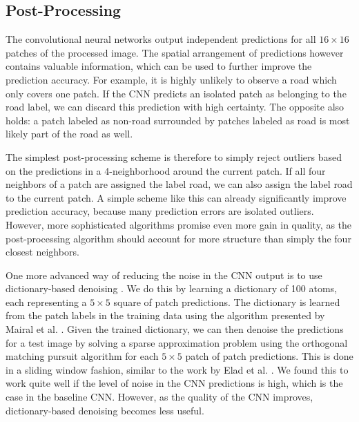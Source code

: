 \documentclass[10pt,conference,compsocconf]{IEEEtran}
\begin{document}
\subsection{Post-Processing}
The convolutional neural networks output independent predictions for all $ 16 \times 16 $ patches of the processed image. The spatial arrangement of predictions however contains valuable information, which can be used to further improve the prediction accuracy. For example, it is highly unlikely to observe a road which only covers one patch. If the CNN predicts an isolated patch as belonging to the road label, we can discard this prediction with high certainty. The opposite also holds: a patch labeled as non-road surrounded by patches labeled as road is most likely part of the road as well.

\par 
The simplest post-processing scheme is therefore to simply reject outliers based on the predictions in a 4-neighborhood around the current patch. If all four neighbors of a patch are assigned the label road, we can also assign the label road to the current patch. A simple scheme like this can already significantly improve prediction accuracy, because many prediction errors are isolated outliers. However, more sophisticated algorithms promise even more gain in quality, as the post-processing algorithm should account for more structure than simply the four closest neighbors.

\par 
One more advanced way of reducing the noise in the CNN output is to use dictionary-based denoising \cite{Elad.2006}. We do this by learning a dictionary of 100 atoms, each representing a  $ 5 \times 5 $ square of patch predictions. The dictionary is learned from the patch labels in the training data using the algorithm presented by Mairal et al. \cite{Mairal.2009}. Given the trained dictionary, we can then denoise the predictions for a test image by solving a sparse approximation problem using the orthogonal matching pursuit algorithm for each $ 5 \times 5 $ patch of patch predictions. This is done in a sliding window fashion, similar to the work by Elad et al. \cite{Elad.2006}. We found this to work quite well if the level of noise in the CNN predictions is high, which is the case in the baseline CNN. However, as the quality of the CNN improves, dictionary-based denoising becomes less useful.
\end{document}
